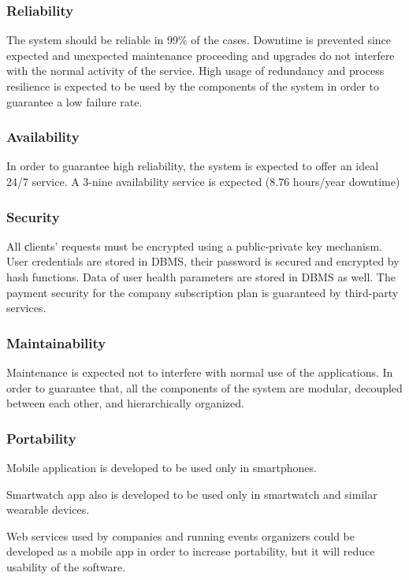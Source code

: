 \subsubsection{Reliability}
The system should be reliable in 99\% of the cases. Downtime is prevented since expected and unexpected maintenance proceeding and upgrades do not interfere with the normal activity of the service.
High usage of redundancy and process resilience is expected to be used by the components of the system in order to guarantee a low failure rate.

\subsubsection{Availability}
In order to guarantee  high reliability, the system is expected to offer an ideal 24/7 service. A 3-nine availability service is expected (8.76 hours/year downtime)

\subsubsection{Security}
All сlients' requests must be encrypted using a public-private key mechanism.
User credentials are stored in DBMS, their password is secured and encrypted by hash functions.
Data of user health parameters are stored in DBMS as well.
The payment security for the company subscription plan is guaranteed by third-party services. 
\subsubsection{Maintainability}
Maintenance is expected not to interfere with normal use of the applications. In order to guarantee that, all the components of the system are modular, decoupled between each other, and hierarchically organized.
\subsubsection{Portability}
Mobile application is developed to be used only in smartphones.

Smartwatch app also is developed to be used only in smartwatch and similar wearable devices.

Web services used by companies and running events organizers could be developed as a mobile app in order to increase portability, but it will reduce usability of the software. 
